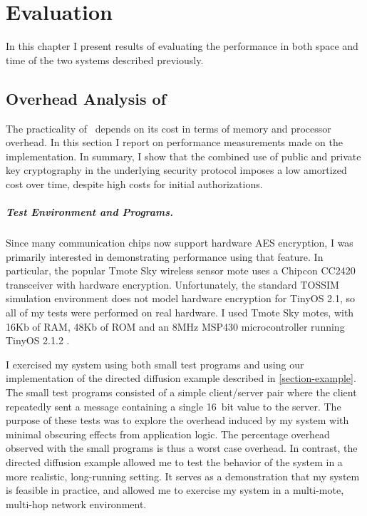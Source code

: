 
\chapter{Evaluation}
\label{chapter-evaluation}

In this chapter I present results of evaluating the performance in both space and time of
the two systems described previously.

\section{Overhead Analysis of \Sprocket}
\label{section-sprocket-overhead}

The practicality of \Sprocket\ depends on its cost in terms of memory and processor overhead. In
this section I report on performance measurements made on the implementation. In summary, I show
that the combined use of public and private key cryptography in the underlying security protocol
imposes a low amortized cost over time, despite high costs for initial authorizations.

\paragraph{Test Environment and Programs.}
Since many communication chips now support hardware AES encryption, I was primarily interested
in demonstrating performance using that feature. In particular, the popular Tmote Sky wireless
sensor mote \cite{tmotesky-datasheet} uses a Chipcon CC2420 transceiver with hardware
encryption. Unfortunately, the standard TOSSIM simulation environment does not model hardware
encryption for TinyOS 2.1, so all of my tests were performed on real hardware. I used Tmote Sky
motes, with 16Kb of RAM, 48Kb of ROM and an 8MHz MSP430 microcontroller running TinyOS 2.1.2
\cite{tinyos}.

I exercised my system using both small test programs and using our implementation of the
directed diffusion example described in \autoref{section-example}. The small test programs
consisted of a simple client/server pair where the client repeatedly sent a message containing a
single 16~bit value to the server. The purpose of these tests was to explore the overhead
induced by my system with minimal obscuring effects from application logic. The percentage
overhead observed with the small programs is thus a worst case overhead. In contrast, the
directed diffusion example allowed me to test the behavior of the system in a more realistic,
long-running setting. It serves as a demonstration that my system is feasible in practice, and
allowed me to exercise my system in a multi-mote, multi-hop network environment.

